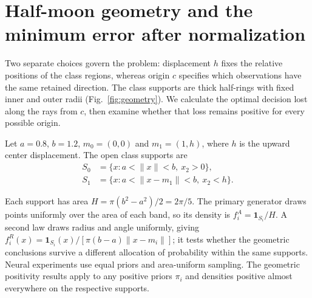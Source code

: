 \section{Half-moon geometry and the minimum error after normalization}
\label{sec:origin-theory}

Two separate choices govern the problem: displacement $h$ fixes the relative positions of the class regions, whereas origin $c$ specifies which observations have the same retained direction. The class supports are thick half-rings with fixed inner and outer radii (Fig.~\ref{fig:geometry}). We calculate the optimal decision lost along the rays from $c$, then examine whether that loss remains positive for every possible origin.

\begin{samepage}
Let $a=0.8$, $b=1.2$, $m_0=(0,0)$ and $m_1=(1,h)$, where $h$ is the upward center displacement. The open class supports are
\begin{align}
 S_0&=\{x:a<\|x\|<b,\ x_2>0\},\nonumber\\
 S_1&=\{x:a<\|x-m_1\|<b,\ x_2<h\}.
 \label{eq:halfmoon-supports}
\end{align}
\end{samepage}
Each support has area $H=\pi(b^2-a^2)/2=2\pi/5$. The primary generator draws points uniformly over the area of each band, so its density is $f_i^A=\mathbf1_{S_i}/H$. A second law draws radius and angle uniformly, giving $f_i^R(x)=\mathbf1_{S_i}(x)/[\pi(b-a)\|x-m_i\|]$; it tests whether the geometric conclusions survive a different allocation of probability within the same supports. Neural experiments use equal priors and area-uniform sampling. The geometric positivity results apply to any positive priors $\pi_i$ and densities positive almost everywhere on the respective supports.

